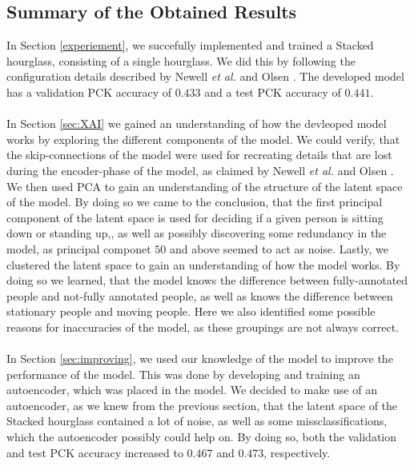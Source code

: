\documentclass[./main.tex]{subfiles}
\begin{document}
\subsection{Summary of the Obtained Results}\label{subsec:summary}
In Section \ref{experiement}, we succefully implemented and trained a Stacked hourglass, consisting of a single hourglass. We did this by following the configuration details described by Newell \textit{et al.} \cite{Newell} and Olsen \cite{Camilla}. The developed model has a validation PCK accuracy of $0.433$ and a test PCK accuracy of $0.441$. 
\\
\\
In Section \ref{sec:XAI} we gained an understanding of how the devleoped model works by exploring the different components of the model. We could verify, that the skip-connections of the model were used for recreating details that are lost during the encoder-phase of the model, as claimed by Newell \textit{et al.} \cite{Newell} and Olsen \cite{Camilla}. We then used PCA to gain an understanding of the structure of the latent space of the model. By doing so we came to the conclusion, that the first principal component of the latent space is used for deciding if a given person is sitting down or standing up,, as well as possibly discovering some redundancy in the model, as principal componet $50$ and above seemed to act as noise. Lastly, we clustered the latent space to gain an understanding of how the model works. By doing so we learned, that the model knows the difference between fully-annotated people and not-fully annotated people, as well as knows the difference between stationary people and moving people. Here we also identified some possible reasons for inaccuracies of the model, as these groupings are not always correct.
\\
\\
In Section \ref{sec:improving}, we used our knowledge of the model to improve the performance of the model. This was done by developing and training an autoencoder, which was placed in the model. We decided to make use of an autoencoder, as we knew from the previous section, that the latent space of the Stacked hourglass contained a lot of noise, as well as some missclassifications, which the autoencoder possibly could help on. By doing so, both the validation and test PCK accuracy increased to $0.467$ and $0.473$, respectively.
\end{document}
